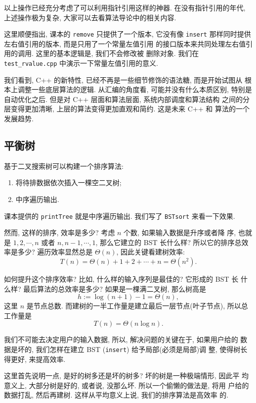 \documentclass[a4paper]{ctexart}
\theoremstyle{definition}
\theoremstyle{definition}
\begin{document}
以上操作已经充分考虑了可以利用指针引用这样的神器. 在没有指针引用的年代,
上述操作极为复杂, 大家可以去看算法导论中的相关内容.

这里顺便指出, 课本的 \verb|remove| 只提供了一个版本, 它没有像
\verb|insert| 那样同时提供左右值引用的版本, 而是只用了一个常量左值引用
的接口版本来共同处理左右值引用的调用. 这里的基本逻辑是, 我们不会修改被
删除对象. 我们在 \verb|test_rvalue.cpp| 中演示一下常量左值引用的意义.

我们看到, C++ 的新特性, 已经不再是一些细节修饰的语法糖, 而是开始试图从
根本上调整一些底层算法的逻辑. 从汇编的角度看, 可能并没有什么本质区别,
特别是自动优化之后. 但是对 C++ 层面和算法层面, 系统内部调度和算法结构
之间的分层变得更加清晰, 上层的算法变得更加直观和简约. 这是未来 C++ 和
算法的一个发展趋势. 

\subsection{平衡树}

基于二叉搜索树可以构建一个排序算法:

\begin{enumerate}
\item 将待排数据依次插入一棵空二叉树;
\item 中序遍历输出.
\end{enumerate}

课本提供的 \verb|printTree| 就是中序遍历输出. 我们写了 \verb|BSTsort|
来看一下效果.

然而, 这样的排序, 效率是多少? 考虑 $n$ 个数, 如果输入数据是升序或者降
序, 也就是 $1, 2, \cdots, n$ 或者 $n, n - 1, \cdots, 1$, 那么它建立的
BST 长什么样? 所以它的排序总效率是多少? 遍历效率显然总是 $\Theta(n)$,
因此关键看建树效率:
$$
T(n) = \Theta(n) + 1 + 2 + \cdots + n = \Theta(n^2).
$$

如何提升这个排序效率? 比如, 什么样的输入序列是最佳的? 它形成的 BST 长
什么样? 最后算法的总效率是多少? 如果是一棵满二叉树, 那么树高是
$$
h :=\log (n + 1) - 1 = \Theta(n),
$$
这里 $n$ 是节点总数. 而建树的一半工作量是建立最后一层节点(叶子节点), 所以总工作量是
$$
T(n) = \Theta(n\log n).
$$

我们不可能去决定用户的输入数据, 所以, 解决问题的关键在于, 如果用户给的
数据是坏的, 我们怎样在建立 BST (\verb|insert|) 给予局部(必须是局部)调
整, 使得树长得更好, 来提高效率.

这里首先说明一点, 是好的树多还是坏的树多? 坏的树是一种极端情形, 因此平
均意义上, 大部分树是好的, 或者说, 没那么坏. 所以一个偷懒的做法是, 将用
户给的数据打乱, 然后再建树. 这样从平均意义上说, 我们的排序算法是高效率
的.
\end{document}
